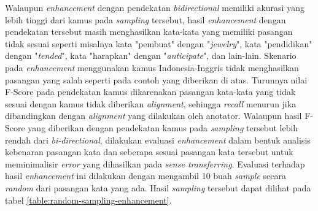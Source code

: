 Walaupun \textit{enhancement} dengan pendekatan \textit{bidirectional} memiliki akurasi yang lebih tinggi dari kamus pada \textit{sampling} tersebut, hasil \textit{enhancement} dengan pendekatan tersebut masih menghasilkan kata-kata yang memiliki pasangan tidak sesuai seperti misalnya kata "pembuat" dengan "\textit{jewelry}", kata "pendidikan" dengan "\textit{tended}", kata "harapkan" dengan "\textit{anticipate}", dan lain-lain. Skenario pada \textit{enhancement} menggunakan kamus Indonesia-Inggris tidak menghasilkan pasangan yang salah seperti pada contoh yang diberikan di atas. Turunnya nilai F-Score pada pendekatan kamus dikarenakan pasangan kata-kata yang tidak sesuai dengan kamus tidak diberikan \textit{alignment}, sehingga \textit{recall} menurun jika dibandingkan dengan \textit{alignment} yang dilakukan oleh anotator. Walaupun hasil F-Score yang diberikan dengan pendekatan kamus pada \textit{sampling} tersebut lebih rendah dari \textit{bi-directional}, dilakukan evaluasi \textit{enhancement} dalam bentuk analisis kebenaran pasangan kata dan seberapa sesuai pasangan kata tersebut untuk meminimalisir \textit{error} yang dihasilkan pada \textit{sense transferring}. Evaluasi terhadap hasil \textit{enhancement} ini dilakukan dengan mengambil 10 buah \textit{sample} secara \textit{random} dari pasangan kata yang ada. Hasil \textit{sampling} tersebut dapat dilihat pada tabel \ref{table:random-sampling-enhancement}.

